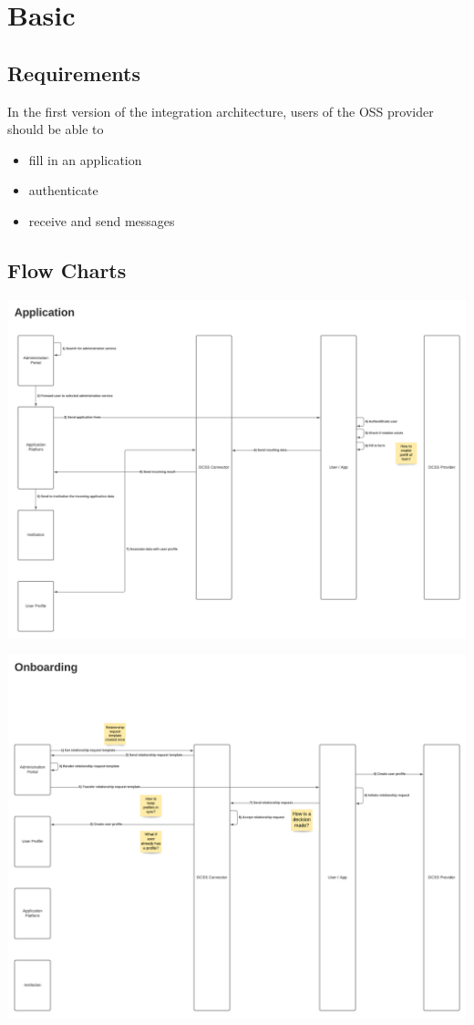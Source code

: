 \documentclass[
     12pt,         %
     a4paper,      %
     BCOR=10mm,version=first,     %
     DIV=14,version=first,        %
     ]{scrreprt}
\begin{document}
\section{Basic}

\subsection{Requirements}
In the first version of the integration architecture, users of the OSS provider should be able to
\begin{itemize}
    \item fill in an application
    \item authenticate
    \item receive and send messages
\end{itemize}

\subsection{Flow Charts}

\includegraphics[width=\textwidth]{Basic Integration Application.png}

\includegraphics[width=\textwidth]{Basic Integration Onboarding.png}
\end{document}
